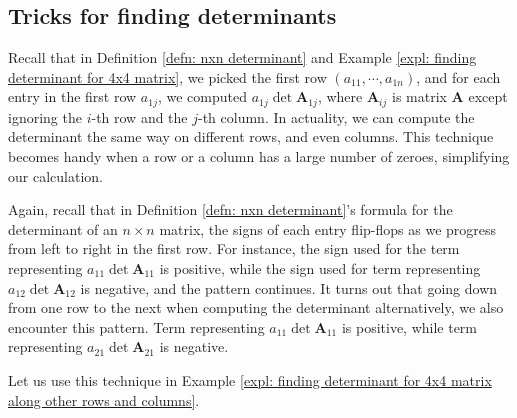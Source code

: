 \documentclass[]{book}
\newcommand{\mat}[1]{\ensuremath{\mathbf{#1}}}
\begin{document}
\subsection{Tricks for finding determinants}
Recall that in Definition \ref{defn: nxn determinant} and Example \ref{expl: finding determinant for 4x4 matrix}, we picked the first row $(a_{11}, \cdots, a_{1n})$, and for each entry in the first row $a_{1j}$, we computed $a_{1j} \det\mat{A}_{1j}$, where $\mat{A}_{ij}$ is matrix $\mat{A}$ except ignoring the $i$-th row and the $j$-th column. In actuality, we can compute the determinant the same way on different rows, and even columns. This technique becomes handy when a row or a column has a large number of zeroes, simplifying our calculation. 

Again, recall that in Definition \ref{defn: nxn determinant}'s formula for the determinant of an $n \times n$ matrix, the signs of each entry flip-flops as we progress from left to right in the first row. For instance, the sign used for the term representing $a_{11}\det\mat{A}_{11}$ is positive, while the sign used for term representing $a_{12}\det\mat{A}_{12}$ is negative, and the pattern continues. It turns out that going down from one row to the next when computing the determinant alternatively, we also encounter this pattern. Term representing $a_{11}\det\mat{A}_{11}$ is positive, while term representing $a_{21}\det\mat{A}_{21}$ is negative. 

Let us use this technique in Example \ref{expl: finding determinant for 4x4 matrix along other rows and columns}.
\end{document}
